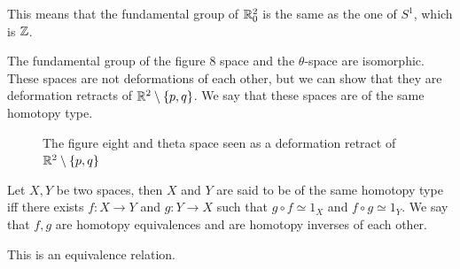 \begin{remark}
    This means that the fundamental group of $\mathbb{R}^2_0$ is the same as the one of $S^1$, which is $\mathbb{Z}$.
\end{remark}
\begin{eg}
    The fundamental group of the figure $8$ space and the $\theta$-space are isomorphic.
    These spaces are not deformations of each other, but we can show that they are deformation retracts of $\mathbb{R}^2 \setminus \{p, q\}$.
    We say that these spaces are of the same homotopy type.
\begin{figure}[H]
    \centering
    \caption{The figure eight and theta space seen as a deformation retract of $\mathbb{R}^2 \setminus \{ p, q\} $}
    \label{fig:figure-eight-theta-space}
\end{figure}
\end{eg}
\begin{definition}
    Let $X, Y$ be two spaces, then $X$ and $Y$ are said to be of the same homotopy type iff there exists $f: X \to Y$ and $g: Y \to X$ such that $g  \circ f \simeq 1_X $ and $f  \circ  g \simeq 1_Y$.
    We say that $f, g$ are homotopy equivalences and are homotopy inverses of each other.
\end{definition}
\begin{remark}
    This is an equivalence relation.
\end{remark}

